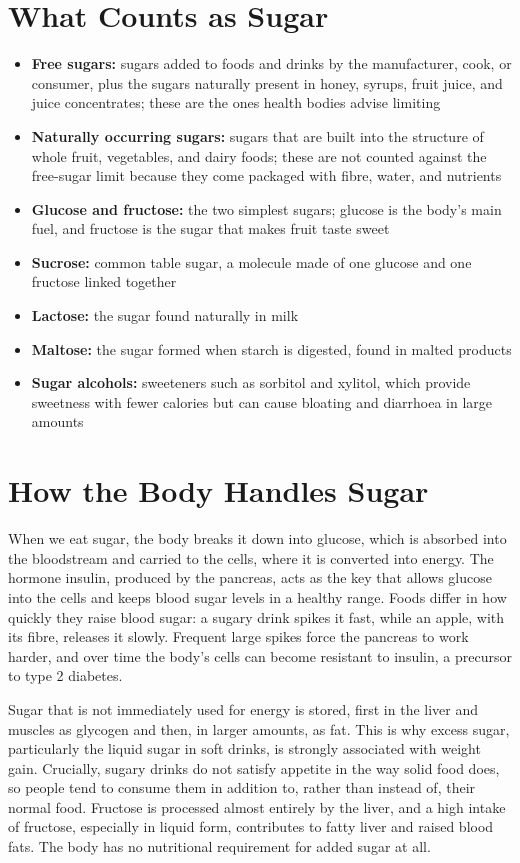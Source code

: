 \section*{What Counts as Sugar}
\begin{itemize}
    \item \textbf{Free sugars:} sugars added to foods and drinks by the manufacturer, cook, or consumer, plus the sugars naturally present in honey, syrups, fruit juice, and juice concentrates; these are the ones health bodies advise limiting
    \item \textbf{Naturally occurring sugars:} sugars that are built into the structure of whole fruit, vegetables, and dairy foods; these are not counted against the free-sugar limit because they come packaged with fibre, water, and nutrients
    \item \textbf{Glucose and fructose:} the two simplest sugars; glucose is the body's main fuel, and fructose is the sugar that makes fruit taste sweet
    \item \textbf{Sucrose:} common table sugar, a molecule made of one glucose and one fructose linked together
    \item \textbf{Lactose:} the sugar found naturally in milk
    \item \textbf{Maltose:} the sugar formed when starch is digested, found in malted products
    \item \textbf{Sugar alcohols:} sweeteners such as sorbitol and xylitol, which provide sweetness with fewer calories but can cause bloating and diarrhoea in large amounts
\end{itemize}

\section*{How the Body Handles Sugar}
When we eat sugar, the body breaks it down into glucose, which is absorbed into the bloodstream and carried to the cells, where it is converted into energy. The hormone insulin, produced by the pancreas, acts as the key that allows glucose into the cells and keeps blood sugar levels in a healthy range. Foods differ in how quickly they raise blood sugar: a sugary drink spikes it fast, while an apple, with its fibre, releases it slowly. Frequent large spikes force the pancreas to work harder, and over time the body's cells can become resistant to insulin, a precursor to type 2 diabetes.

Sugar that is not immediately used for energy is stored, first in the liver and muscles as glycogen and then, in larger amounts, as fat. This is why excess sugar, particularly the liquid sugar in soft drinks, is strongly associated with weight gain. Crucially, sugary drinks do not satisfy appetite in the way solid food does, so people tend to consume them in addition to, rather than instead of, their normal food. Fructose is processed almost entirely by the liver, and a high intake of fructose, especially in liquid form, contributes to fatty liver and raised blood fats. The body has no nutritional requirement for added sugar at all.

